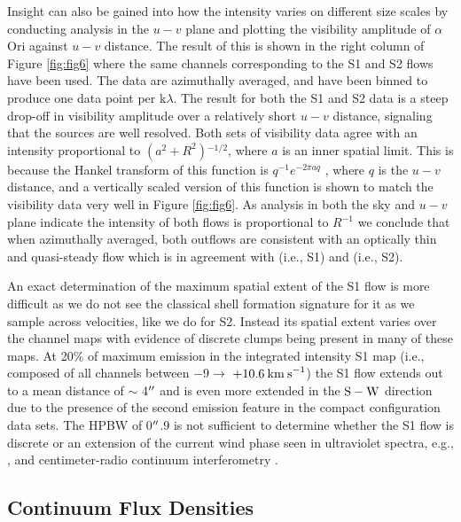 \documentclass[iop]{emulateapj}
\begin{document}
Insight can also be gained into how the intensity varies on different size scales by conducting analysis in the $u-v$ plane and plotting the visibility amplitude of $\alpha$ Ori against $u-v$ distance. The result of this is shown in the right column of Figure \ref{fig:fig6} where the same channels corresponding to the S1 and S2 flows have been used. The data are azimuthally averaged, and have been binned to produce one data point per k$\lambda$. The result for both the S1 and S2 data is a steep drop-off in visibility amplitude over a relatively short $u-v$ distance, signaling that the sources are well resolved. Both sets of visibility data agree with an intensity proportional to $(a^2 + R^2){}^{-1/2}$, where $a$ is an inner spatial limit. This is because the Hankel transform of this function is $q^{-1}e^{-2\pi aq}$ \citep{2000fta..book.....B}, where $q$ is the $u-v$ distance, and a vertically scaled version of this function is shown to match the visibility data very well in Figure \ref{fig:fig6}. As analysis in both the sky and $u-v$ plane indicate the intensity of both flows is proportional to $R{}^{-1}$ we conclude that when azimuthally averaged, both outflows are  consistent with an optically thin and quasi-steady flow which is in agreement with \cite{2009AJ....137.3558S} (i.e., S1) and \cite{2002A&A...386.1009P} (i.e., S2). 

An exact determination of the maximum spatial extent of the S1 flow is more difficult as we do not see the classical shell formation signature for it as we sample across velocities, like we do for S2. Instead its spatial extent varies over the channel maps with evidence of discrete clumps being present in many of these maps. At 20\% of maximum emission in the integrated intensity S1 map (i.e., composed of all channels between $-9 \rightarrow$ $+10.6\>{\rm km\>s}^{-1}$) the S1 flow extends out to a mean distance of $\sim$ 4$\mbox{$^{\prime\prime}$}$ and is even more extended in the $\rm{S-W}$ direction due to the presence of the second emission feature in the compact configuration data sets. The HPBW of 0$\mbox{$^{\prime\prime}$}$.9 is not sufficient to determine whether the S1 flow is discrete or an extension of the current wind phase seen in ultraviolet spectra, e.g., \cite{1997ApJ...479..970C}, and centimeter-radio continuum interferometry \citep{1998Natur.392..575L, harper_2001}.

\subsection{Continuum Flux Densities} \label{results4} 
\end{document}
